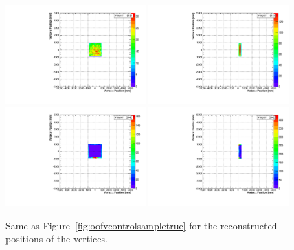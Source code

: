 \begin{figure}[ht]
  \center
  \includegraphics[width=0.48\textwidth]{T2K-TN-313/images/systematics/xy_infv_reco.pdf}
  \includegraphics[width=0.48\textwidth]{T2K-TN-313/images/systematics/xz_infv_reco.pdf} \\
  \includegraphics[width=0.48\textwidth]{T2K-TN-313/images/systematics/xy_oofv_reco.pdf}
  \includegraphics[width=0.48\textwidth]{T2K-TN-313/images/systematics/xz_oofv_reco.pdf} \\
  \caption[Reconstructed positions of the events selected for the
  estimation of the OOAFV error]{Same as
    Figure~\ref{fig:oofvcontrolsampletrue} for the reconstructed
    positions of the vertices.}
  \label{fig:oofvcontrolsamplereco}
\end{figure}

